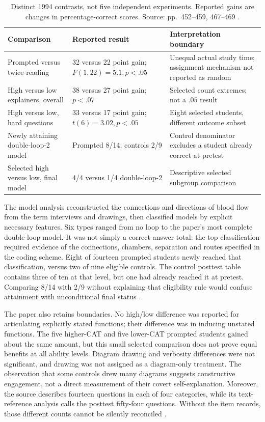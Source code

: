 \begin{table}[htbp]
\centering
\small
\begin{tabular}{p{.38\linewidth}p{.26\linewidth}p{.27\linewidth}}
\hline
Comparison & Reported result & Interpretation boundary\\
\hline
Prompted versus twice-reading & 32 versus 22 point gain;
\(F(1,22)=5.1,p<.05\) & Unequal actual study time; assignment mechanism
not reported as random\\
High versus low explainers, overall & 38 versus 27 point gain;
\(p<.07\) & Selected count extremes; not a \(.05\) result\\
High versus low, hard questions & 33 versus 17 point gain;
\(t(6)=3.02,p<.05\) & Eight selected students, different outcome subset\\
Newly attaining double-loop-2 model & Prompted 8/14; controls 2/9 &
Control denominator excludes a student already correct at pretest\\
Selected high versus low, final model & 4/4 versus 1/4 double-loop-2 &
Descriptive selected subgroup comparison\\
\hline
\end{tabular}
\caption{Distinct 1994 contrasts, not five independent experiments.
Reported gains are changes in percentage-correct scores.
Source: pp.~452--459, 467--469 \cite{ChiEtAl1994Eliciting}.}
\label{tab:p19-self-explanation-biology}
\end{table}

The model analysis reconstructed the connections and directions of blood
flow from the term interviews and drawings, then classified models by
explicit necessary features. Six types ranged from no loop to the paper's
most complete double-loop model. It was not simply a correct-answer total:
the top classification required evidence of the connections, chambers,
separation and routes specified in the coding scheme. Eight of fourteen
prompted students newly reached that classification, versus two of nine
eligible controls. The control posttest table contains three of ten at that
level, but one had already reached it at pretest. Comparing 8/14 with 2/9
without explaining that eligibility rule would confuse attainment with
unconditional final status
\cite[pp.~464--469, Tables~4--5]{ChiEtAl1994Eliciting}.

The paper also retains boundaries. No high/low difference was reported for
articulating explicitly stated functions; their difference was in inducing
unstated functions. The five higher-CAT and five lower-CAT prompted
students gained about the same amount, but this small selected comparison
does not prove equal benefits at all ability levels. Diagram drawing and
verbosity differences were not significant, and drawing was not assigned
as a diagram-only treatment. The observation that some controls drew many
diagrams suggests constructive engagement, not a direct measurement of
their covert self-explanation. Moreover, the source describes fourteen
questions in each of four categories, while its text-reference analysis
calls the posttest fifty-four questions. Without the item records, those
different counts cannot be silently reconciled
\cite[pp.~458--463]{ChiEtAl1994Eliciting}.


